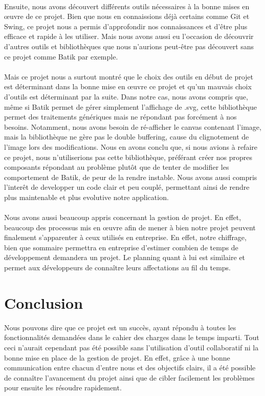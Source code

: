\documentclass[a4paper,11pt]{article}
\begin{document}
\paragraph{} Ensuite, nous avons découvert différents outils nécessaires à la bonne mises en œuvre de ce projet. Bien que nous en connaissions déjà certains comme Git et Swing, ce projet nous a permis d'approfondir nos connaissances et d'être plus efficace et rapide à les utiliser. Mais nous avons aussi eu l'occasion de découvrir d'autres outils et bibliothèques que nous n'aurions peut-être pas découvert sans ce projet comme Batik par exemple.

\paragraph{} Mais ce projet nous a surtout montré que le choix des outils en début de projet est déterminant dans la bonne mise en œuvre ce projet et qu'un mauvais choix d'outils est déterminant par la suite. Dans notre cas, nous avons compris que, même si Batik permet de gérer simplement l'affichage de .svg, cette bibliothèque permet des traitements génériques mais ne répondant pas forcément à nos besoins. Notamment, nous avons besoin de ré-afficher le canvas contenant l'image, mais la bibliothèque ne gère pas le double buffering, cause du clignotement de l'image lors des modifications. Nous en avons conclu que, si nous avions à refaire ce projet, nous n'utiliserions pas cette bibliothèque, préférant créer nos propres composants répondant au problème plutôt que de tenter de modifier les comportement de Batik, de peur de la rendre instable. Nous avons aussi compris l'interêt de developper un code clair et peu couplé, permettant ainsi de rendre plus maintenable et plus evolutive notre application.

\paragraph{} Nous avons aussi beaucoup appris concernant la gestion de projet. En effet, beaucoup des processus mis en œuvre afin de mener à bien notre projet peuvent finalement s'apparenter à ceux utilisés en entreprise. En effet, notre chiffrage, bien que sommaire permettra en entreprise d'estimer combien de temps de développement demandera un projet. Le planning quant à lui est similaire et permet aux développeurs de connaître leurs affectations au fil du temps.



\section{Conclusion}
Nous pouvons dire que ce projet est un succès, ayant répondu à toutes les fonctionnalités demandées dans le cahier des charges dans le temps imparti. Tout ceci n'aurait cependant pas été possible sans l'utilisation d'outil collaboratif ni la bonne mise en place de la gestion de projet. En effet, grâce à une bonne communication entre chacun d'entre nous et des objectifs clairs, il a été possible de connaître l'avancement du projet ainsi que de cibler facilement les problèmes pour ensuite les résoudre rapidement.
\end{document}
